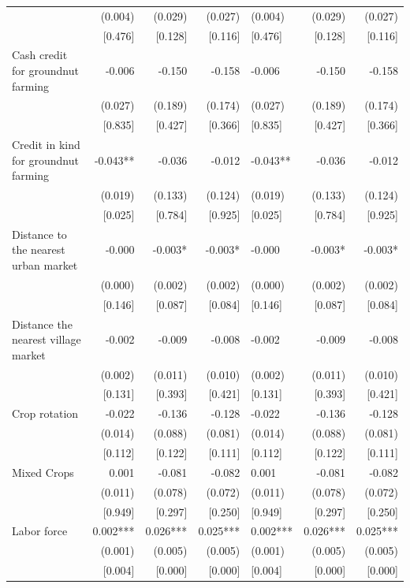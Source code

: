 \documentclass[
]{article}
\begin{document}
\begin{ThreePartTable}
\begin{longtable}[t]{lrrrlrr}
 & (0.004) & (0.029) & (0.027) & (0.004) & (0.029) & (0.027)\\
 & {}[0.476] & {}[0.128] & {}[0.116] & {}[0.476] & {}[0.128] & {}[0.116]\\
Cash credit for groundnut farming & -0.006 & -0.150 & -0.158 & -0.006 & -0.150 & -0.158\\
 & (0.027) & (0.189) & (0.174) & (0.027) & (0.189) & (0.174)\\
 & {}[0.835] & {}[0.427] & {}[0.366] & {}[0.835] & {}[0.427] & {}[0.366]\\
Credit in kind for groundnut farming & -0.043** & -0.036 & -0.012 & -0.043** & -0.036 & -0.012\\
 & (0.019) & (0.133) & (0.124) & (0.019) & (0.133) & (0.124)\\
 & {}[0.025] & {}[0.784] & {}[0.925] & {}[0.025] & {}[0.784] & {}[0.925]\\
Distance to the nearest urban market & -0.000 & -0.003* & -0.003* & -0.000 & -0.003* & -0.003*\\
 & (0.000) & (0.002) & (0.002) & (0.000) & (0.002) & (0.002)\\
 & {}[0.146] & {}[0.087] & {}[0.084] & {}[0.146] & {}[0.087] & {}[0.084]\\
Distance the nearest village market & -0.002 & -0.009 & -0.008 & -0.002 & -0.009 & -0.008\\
 & (0.002) & (0.011) & (0.010) & (0.002) & (0.011) & (0.010)\\
 & {}[0.131] & {}[0.393] & {}[0.421] & {}[0.131] & {}[0.393] & {}[0.421]\\
Crop rotation & -0.022 & -0.136 & -0.128 & -0.022 & -0.136 & -0.128\\
 & (0.014) & (0.088) & (0.081) & (0.014) & (0.088) & (0.081)\\
 & {}[0.112] & {}[0.122] & {}[0.111] & {}[0.112] & {}[0.122] & {}[0.111]\\
Mixed Crops & 0.001 & -0.081 & -0.082 & 0.001 & -0.081 & -0.082\\
 & (0.011) & (0.078) & (0.072) & (0.011) & (0.078) & (0.072)\\
 & {}[0.949] & {}[0.297] & {}[0.250] & {}[0.949] & {}[0.297] & {}[0.250]\\
Labor force & 0.002*** & 0.026*** & 0.025*** & 0.002*** & 0.026*** & 0.025***\\
 & (0.001) & (0.005) & (0.005) & (0.001) & (0.005) & (0.005)\\
 & {}[0.004] & {}[0.000] & {}[0.000] & {}[0.004] & {}[0.000] & {}[0.000]\\

\end{longtable}
\end{ThreePartTable}
\end{document}
